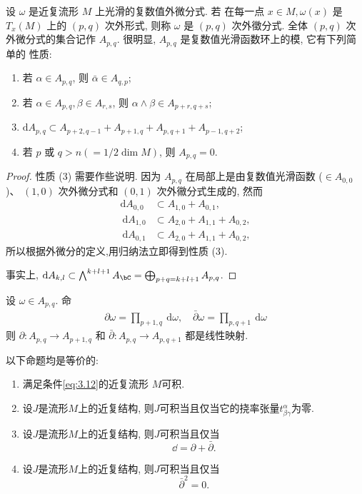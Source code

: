 \begin{definition}[][$(p,q)$次外微分式空间 $A_{p,q}$]
    设 $\omega$ 是近复流形 $M$ 上光滑的复数值外微分式. 若 在每一点 $x \in M, \omega(x)$ 是 $T_x(M)$ 上的 $(p, q)$ 次外形式, 则称 $\omega$ 是 $(p, q)$ 次外徵分式. 全体 $(p, q)$ 次外微分式的集合记作 $A_{p, q}$.
    很明显, $A_{p, q}$ 是复数值光滑函数环上的模, 它有下列简单的 性质:
    \begin{enumerate}[label=(\arabic*),font=\upshape]
        \item 若 $\alpha \in A_{p, q}$, 则 $\bar{\alpha} \in A_{q, p}$;
        \item 若 $\alpha \in A_{p, q}, \beta \in A_{r, s}$, 则 $\alpha \wedge \beta \in A_{p+r, q+s}$;
        \item {\color{VioletRed}$\mathrm{d} A_{p, q} \subset A_{p+2, q-1}+A_{p+1, q}+A_{p, q+1}+A_{p-1, q+2}$;}
        \item  若 $p$ 或 $q>n\left(=1/2 \operatorname{dim} M\right)$, 则 $A_{p, q}=0$.
    \end{enumerate}
\end{definition}
\begin{proof}
    性质 (3) 需要作些说明. 因为 $A_{p, q}$ 在局部上是由复数值光滑函数 ($\in A_{0,0}$)、 $(1,0)$ 次外微分式和 $(0,1)$ 次外幑分式生成的, 然而
        \begin{align*}
        \mathrm{d} A_{0,0} &\subset A_{1,0}+A_{0,1}, \\
        \mathrm{~d} A_{1,0} &\subset A_{2,0}+A_{1,1}+A_{0,2}, \\
        \mathrm{~d} A_{0,1} &\subset A_{2,0}+A_{1,1}+A_{0,2},
        \end{align*}
        所以根据外微分的定义,用归纳法立即得到性质 (3).

        事实上, $\dd A_{k,l} \subset \bigwedge^{k+l+1} A_\bC =\bigoplus_{p+q=k+l+1}A_{p,q}$.
\end{proof}

设 $\omega \in A_{p, q}$. 命
        \begin{align}
        \partial \omega=\prod_{p+1, q} \mathrm{~d} \omega, \quad \bar{\partial} \omega=\prod_{p, q+1} \mathrm{~d} \omega
        \end{align}
则 $\partial: A_{p, q} \rightarrow A_{p+1, q}$ 和 $\bar{\partial}: A_{p, q} \rightarrow A_{p, q+1}$ 都是线性映射.

\begin{theorem}[][近复流形可积充要条件]
    以下命题均是等价的:
    \begin{enumerate}[font=\upshape]
        \item 满足条件\eqref{eq:3.12}的近复流形 $M$可积.
        \item 设$J$是流形$M$上的近复结构, 则$J$可积当且仅当它的挠率张量$t_{\beta\gamma}^\alpha$为零. 
        \item 设$J$是流形$M$上的近复结构, 则$J$可积当且仅当\[\dd=\partial+\bar{\partial}.\]
        \item 设$J$是流形$M$上的近复结构, 则$J$可积当且仅当 \[\bar{\partial}^2=0.\]
    \end{enumerate}
\end{theorem}





